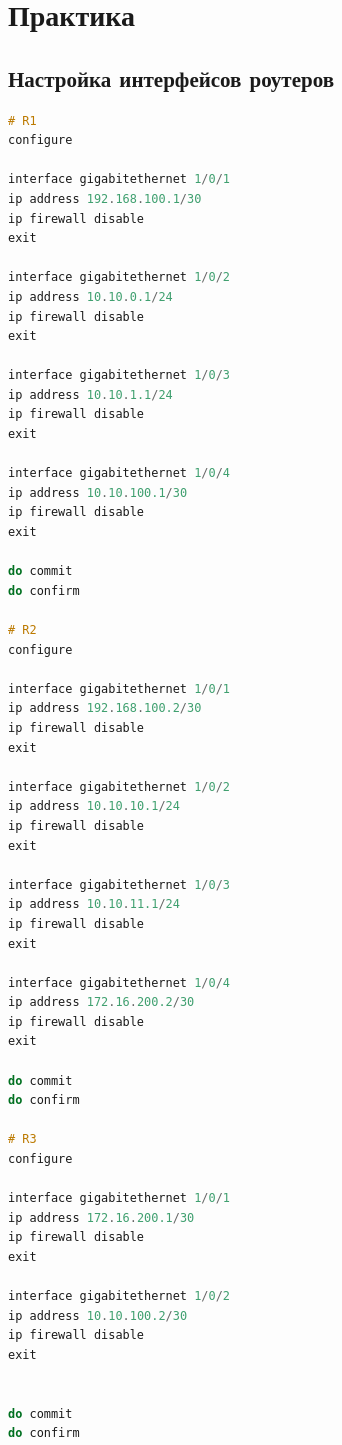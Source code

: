 \chapter{Практика}


\section{Настройка интерфейсов роутеров}

\begin{lstlisting}[language=C, caption={Пример настройки интерфейсов роутера}]
# R1
configure

interface gigabitethernet 1/0/1
ip address 192.168.100.1/30
ip firewall disable
exit

interface gigabitethernet 1/0/2
ip address 10.10.0.1/24
ip firewall disable
exit

interface gigabitethernet 1/0/3
ip address 10.10.1.1/24
ip firewall disable
exit

interface gigabitethernet 1/0/4
ip address 10.10.100.1/30
ip firewall disable
exit

do commit
do confirm

# R2
configure

interface gigabitethernet 1/0/1
ip address 192.168.100.2/30
ip firewall disable
exit

interface gigabitethernet 1/0/2
ip address 10.10.10.1/24
ip firewall disable
exit

interface gigabitethernet 1/0/3
ip address 10.10.11.1/24
ip firewall disable
exit

interface gigabitethernet 1/0/4
ip address 172.16.200.2/30
ip firewall disable
exit

do commit
do confirm

# R3
configure

interface gigabitethernet 1/0/1
ip address 172.16.200.1/30
ip firewall disable
exit

interface gigabitethernet 1/0/2
ip address 10.10.100.2/30
ip firewall disable
exit 


do commit
do confirm
\end{lstlisting}




